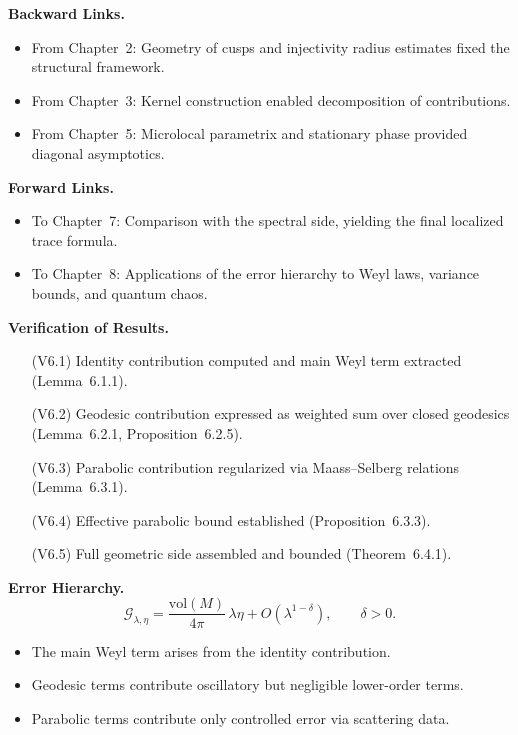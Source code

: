 \medskip

\noindent\textbf{Backward Links.}
\begin{itemize}
  \item From Chapter~2: Geometry of cusps and injectivity radius estimates fixed the structural framework.  
  \item From Chapter~3: Kernel construction enabled decomposition of contributions.  
  \item From Chapter~5: Microlocal parametrix and stationary phase provided diagonal asymptotics.  
\end{itemize}

\medskip

\noindent\textbf{Forward Links.}
\begin{itemize}
  \item To Chapter~7: Comparison with the spectral side, yielding the final localized trace formula.  
  \item To Chapter~8: Applications of the error hierarchy to Weyl laws, variance bounds, and quantum chaos.  
\end{itemize}

\medskip

\noindent\textbf{Verification of Results.}
\begin{itemize}
  \item[(V6.1)] Identity contribution computed and main Weyl term extracted (Lemma~6.1.1).  
  \item[(V6.2)] Geodesic contribution expressed as weighted sum over closed geodesics (Lemma~6.2.1, Proposition~6.2.5).  
  \item[(V6.3)] Parabolic contribution regularized via Maass–Selberg relations (Lemma~6.3.1).  
  \item[(V6.4)] Effective parabolic bound established (Proposition~6.3.3).  
  \item[(V6.5)] Full geometric side assembled and bounded (Theorem~6.4.1).  
\end{itemize}

\medskip

\noindent\textbf{Error Hierarchy.}
\[
  \mathcal{G}_{\lambda,\eta}
  = \frac{\mathrm{vol}(M)}{4\pi}\, \lambda\eta
  + O(\lambda^{1-\delta}), \qquad \delta>0.
\]
\begin{itemize}
  \item The main Weyl term arises from the identity contribution.  
  \item Geodesic terms contribute oscillatory but negligible lower-order terms.  
  \item Parabolic terms contribute only controlled error via scattering data.  
\end{itemize}

